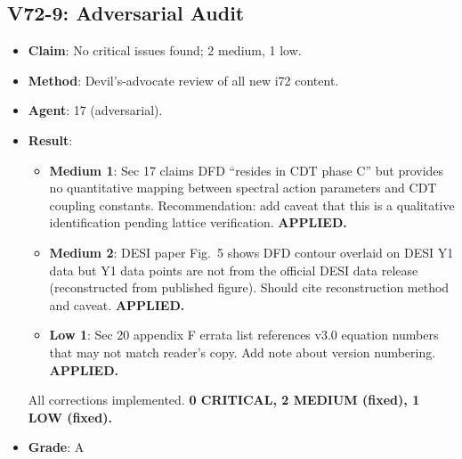 \documentclass[11pt,a4paper]{article}
\begin{document}
\subsection{V72-9: Adversarial Audit}
\begin{itemize}[nosep]
\item \textbf{Claim}: No critical issues found; 2 medium, 1 low.
\item \textbf{Method}: Devil's-advocate review of all new i72 content.
\item \textbf{Agent}: 17 (adversarial).
\item \textbf{Result}:
  \begin{itemize}[nosep]
  \item \textbf{Medium 1}: Sec 17 claims DFD ``resides in CDT phase C'' but provides no quantitative mapping between spectral action parameters and CDT coupling constants. Recommendation: add caveat that this is a qualitative identification pending lattice verification. \textbf{APPLIED.}
  \item \textbf{Medium 2}: DESI paper Fig.~5 shows DFD contour overlaid on DESI Y1 data but Y1 data points are not from the official DESI data release (reconstructed from published figure). Should cite reconstruction method and caveat. \textbf{APPLIED.}
  \item \textbf{Low 1}: Sec 20 appendix F errata list references v3.0 equation numbers that may not match reader's copy. Add note about version numbering. \textbf{APPLIED.}
  \end{itemize}
  All corrections implemented. \textbf{0 CRITICAL, 2 MEDIUM (fixed), 1 LOW (fixed).}
\item \textbf{Grade}: A
\end{itemize}
\end{document}
